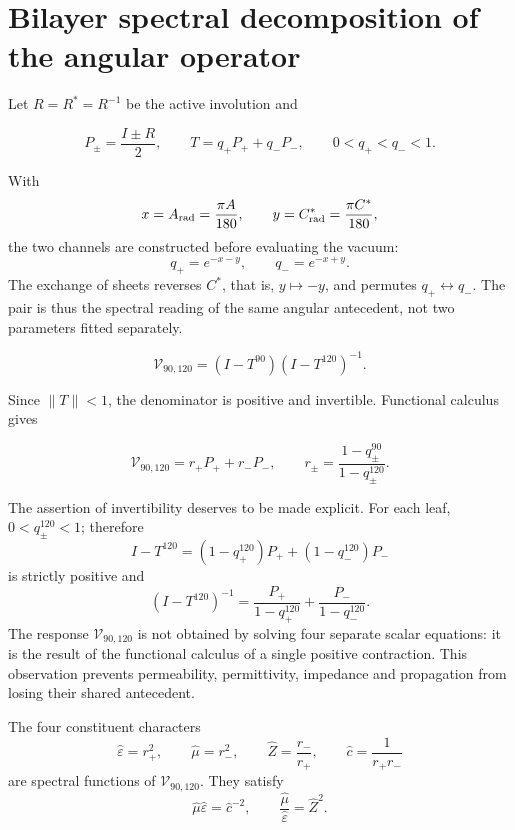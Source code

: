 \section{Bilayer spectral decomposition of the angular operator}

Let \(R=R^*=R^{-1}\) be the active involution and

\[
P_\pm=\frac{I\pm R}{2},
\qquad
T=q_+P_+ +q_-P_-,
\qquad 0<q_+<q_-<1.
\]

With
\[
x=A_{\rm rad}=\frac{\pi A}{180},\qquad
y=C^*_{\rm rad}=\frac{\pi C^*}{180},
\]
the two channels are constructed before evaluating the vacuum:
\begin{equation}
q_+=e^{-x-y},\qquad q_-=e^{-x+y}.
\label{eq:vacuum-angular-channels}
\end{equation}
The exchange of sheets reverses \(C^*\), that is, \(y\mapsto-y\), and permutes \(q_+\leftrightarrow q_-\). The pair is thus the spectral reading of the same angular antecedent, not two parameters fitted separately.

\begin{definition}
\begin{equation}
\mathcal V_{90,120}=(I-T^{90})(I-T^{120})^{-1}.
\label{eq:vacuum-operator}
\end{equation}
\end{definition}

Since \(\|T\|<1\), the denominator is positive and invertible. Functional calculus gives

\begin{equation}
\mathcal V_{90,120}=r_+P_+ +r_-P_-,
\qquad
r_\pm=\frac{1-q_\pm^{90}}{1-q_\pm^{120}}.
\label{eq:vacuum-eigenvalues}
\end{equation}

The assertion of invertibility deserves to be made explicit. For each leaf,
\(0<q_\pm^{120}<1\); therefore
\[
I-T^{120}=(1-q_+^{120})P_++(1-q_-^{120})P_-
\]
is strictly positive and
\[
(I-T^{120})^{-1}
=\frac{P_+}{1-q_+^{120}}+
 \frac{P_-}{1-q_-^{120}}.
\]
The response \(\mathcal V_{90,120}\) is not obtained by solving four
separate scalar equations: it is the result of the functional calculus of a
single positive contraction. This observation prevents permeability,
permittivity, impedance and propagation from losing their shared antecedent.

\begin{theorem}
The four constituent characters
\begin{equation}
\widehat\varepsilon=r_+^2,\qquad
\widehat\mu=r_-^2,\qquad
\widehat Z=\frac{r_-}{r_+},\qquad
\widehat c=\frac1{r_+r_-}
\label{eq:vacuum-four}
\end{equation}
are spectral functions of \(\mathcal V_{90,120}\). They satisfy
\begin{equation}
\widehat\mu\widehat\varepsilon=\widehat c^{-2},
\qquad
\frac{\widehat\mu}{\widehat\varepsilon}=\widehat Z^2.
\label{eq:vacuum-relations}
\end{equation}
\end{theorem}

